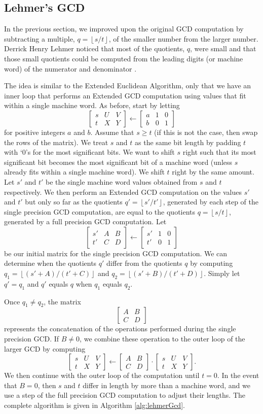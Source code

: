 \documentclass{ucalgthes1}
\theoremstyle{definition}
\newcommand{\matrixtt}[4]{\left[ \begin{array}{rr} #1 & #2 \\ #3 & #4 \end{array} \right]}
\newcommand{\matrixThreeTwo}[6]{\left[ \begin{array}{rrr} #1 & #2 & #3 \\ #4 & #5 & #6 \end{array} \right]}
\newcommand{\floor}[1]{\left\lfloor #1 \right\rfloor}
\begin{document}
\subsection{Lehmer's GCD}

In the previous section, we improved upon the original GCD computation by subtracting a multiple, $q = \floor{s / t}$, of the smaller number from the larger number.  Derrick Henry Lehmer noticed that most of the quotients, $q$, were small and that those small quotients could be computed from the leading digits (or machine word) of the numerator and denominator \cite{Lehmer1938}.

The idea is similar to the Extended Euclidean Algorithm, only that we have an inner loop that performs an Extended GCD computation using values that fit within a single machine word.  As before, start by letting
\[
	\matrixThreeTwo{s}{U}{V}{t}{X}{Y} \gets \matrixThreeTwo{a}{1}{0}{b}{0}{1}
\]
for positive integers $a$ and $b$.  Assume that $s \ge t$ (if this is not the case, then swap the rows of the matrix).  We treat $s$ and $t$ as the same bit length by padding $t$ with `0's for the most significant bits.  We want to shift $s$ right such that its most significant bit becomes the most significant bit of a machine word (unless $s$ already fits within a single machine word).  We shift $t$ right by the same amount. Let $s'$ and $t'$ be the single machine word values obtained from $s$ and $t$ respectively.  We then perform an Extended GCD computation on the values $s'$ and $t'$ but only so far as the quotients $q'=\floor{s'/t'}$, generated by each step of the single precision GCD computation, are equal to the quotients $q=\floor{s/t}$, generated by a full precision GCD computation.  Let
\[
\matrixThreeTwo{s'}{A}{B}{t'}{C}{D} \gets \matrixThreeTwo{s'}{1}{0}{t'}{0}{1}
\]
be our initial matrix for the single precision GCD computation.  We can determine when the quotients $q'$ differ from the quotients $q$ by computing $q_1 = \floor{(s'+A)/(t'+C)}$ and $q_2 = \floor{(s'+B)/(t'+D)}$.  Simply let $q' = q_1$ and $q'$ equals $q$ when $q_1$ equals $q_2$.

Once $q_1 \neq q_2$, the matrix
\[
\matrixtt{A}{B}{C}{D}
\]
represents the concatenation of the operations performed during the single precision GCD.  If $B \neq 0$, we combine these operation to the outer loop of the larger GCD by computing
\[
\matrixThreeTwo{s}{U}{V}{t}{X}{Y} \gets \matrixtt{A}{B}{C}{D}
		        \cdot \matrixThreeTwo{s}{U}{V}{t}{X}{Y}.
\]
We then continue with the outer loop of the computation until $t = 0$.  In the event that $B=0$, then $s$ and $t$ differ in length by more than a machine word, and we use a step of the full precision GCD computation to adjust their lengths.  The complete algorithm is given in Algorithm \ref{alg:lehmerGcd}.
\end{document}
